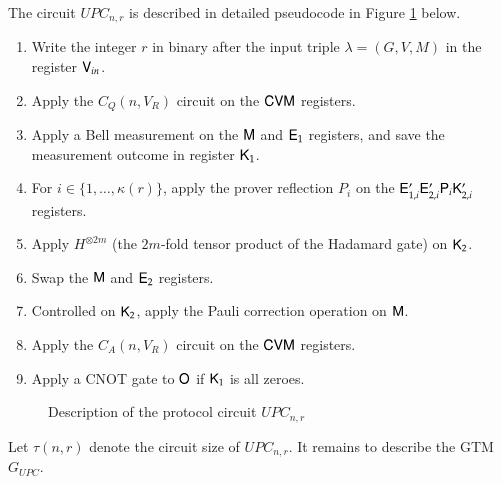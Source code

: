 The circuit $UPC_{n,r}$ is described in detailed pseudocode in Figure \ref{fig:upc} below.

\begin{center}
\begin{mdframed}
	\begin{enumerate}
		\item Write the integer $r$ in binary after the input triple $\lambda = (G,V,M)$ in the register ${\mathsf{V}}_{in}$.
		\item Apply the $C_Q(n,V_R)$ circuit on the ${\mathsf{C}} {\mathsf{V}} {\mathsf{M}}$ registers.
    \item Apply a Bell measurement on the ${\mathsf{M}}$ and ${\mathsf{E}}_1$ registers, and save the measurement outcome in register ${\mathsf{K}}_1$.
    \item For $i \in \{1,\ldots,\kappa(r)\}$, apply the prover reflection $P_i$ on the ${\mathsf{E}}_{1,i}' {\mathsf{E}}_{2,i}' {\mathsf{P}}_i {\mathsf{K}}_{2,i}'$ registers.
    \item Apply $H^{\otimes 2m}$ (the $2m$-fold tensor product of the Hadamard gate) on ${\mathsf{K}}_2$. 
    \item Swap the ${\mathsf{M}}$ and ${\mathsf{E}}_2$ registers.
    \item Controlled on ${\mathsf{K}}_2$, apply the Pauli correction operation on ${\mathsf{M}}$.
    \item Apply the $C_A(n,V_R)$ circuit on the ${\mathsf{C}} {\mathsf{V}} {\mathsf{M}}$ registers.
    \item Apply a CNOT gate to ${\mathsf{O}}$ if ${\mathsf{K}}_1$ is all zeroes.
    \end{enumerate}
\end{mdframed}
\begin{figure}[H]
\caption{Description of the protocol circuit \textsc{$UPC_{n,r}$}}
\label{fig:upc}
\end{figure}
\end{center}







Let $\tau(n,r)$ denote the circuit size of $UPC_{n,r}$. It remains to describe the GTM $G_{UPC}$. 

